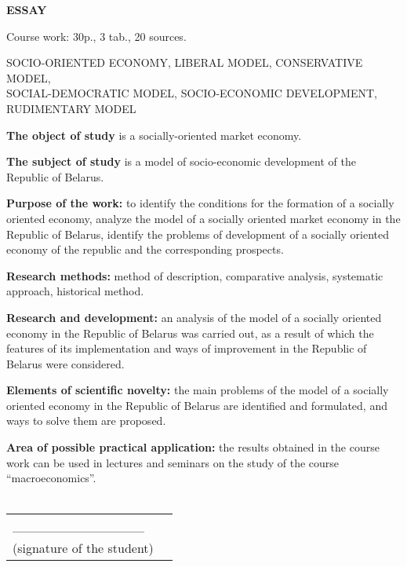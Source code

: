 \documentclass[14pt,a4paper]{article}
\begin{document}
    \newpage
    \begin{center}
        \textbf{\LARGE{ESSAY}}
    \end{center}
    \par
    Course work: 30p., 3 tab., 20 sources.
    \\
    \par
    \large{SOCIO-ORIENTED ECONOMY, LIBERAL MODEL, CONSERVATIVE MODEL,}
    \\
    \large{SOCIAL-DEMOCRATIC MODEL, SOCIO-ECONOMIC DEVELOPMENT,}
    \\
    \large{RUDIMENTARY MODEL}
    \\
    \par
    \textbf{The object of study} is a socially-oriented market economy.
    \par
    \textbf{The subject of study} is a model of socio-economic development of the Republic of Belarus.
    \par
    \textbf{Purpose of the work:} to identify the conditions for the formation of a socially oriented economy, analyze the model of a socially oriented market economy in the Republic of Belarus, identify the problems of development of a socially oriented economy of the republic and the corresponding prospects.
    \par
    \textbf{Research methods:} method of description, comparative analysis, systematic approach, historical method.
    \par
    \textbf{Research and development:} an analysis of the model of a socially oriented economy in the Republic of Belarus was carried out, as a result of which the features of its implementation and ways of improvement in the Republic of Belarus were considered.
    \par
    \textbf{Elements of scientific novelty:} the main problems of the model of a socially oriented economy in the Republic of Belarus are identified and formulated, and ways to solve them are proposed.
    \par
    \textbf{Area of possible practical application:} the results obtained in the course work can be used in lectures and seminars on the study of the course ``macroeconomics''.
    \\
    \\
    \hfill\begin{tabular}{lp{.5\linewidth}@{}}
              \_\_\_\_\_\_\_\_\_\_\_\_\_\_
              \\
              (signature of the student) \\
    \end{tabular}
\end{document}
